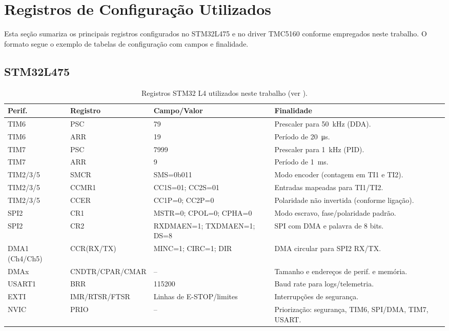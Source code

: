 \FloatBarrier
\section{Registros de Configura\c{c}\~ao Utilizados}

Esta se\c{c}\~ao sumariza os principais registros configurados no STM32L475 e
no driver TMC5160 conforme empregados neste trabalho. O formato segue o
exemplo de tabelas de configura\c{c}\~ao com campos e finalidade.

\subsection{STM32L475}

\begin{table}[H]
  \centering
  \caption{Registros STM32 L4 utilizados neste trabalho (ver \cite{st_an4013,stm32l4_rm}).}
  \label{tab:regs-stm32}
  \setlength{\tabcolsep}{4pt}\footnotesize
  \begin{tabularx}{\textwidth}{lllX}
    \toprule
    Perif. & Registro & Campo/Valor & Finalidade \\
    \midrule
    TIM6 & PSC & 79 & Prescaler para \SI{50}{kHz} (DDA). \\
    TIM6 & ARR & 19 & Per\'iodo de \SI{20}{\micro s}. \\
    TIM7 & PSC & 7999 & Prescaler para \SI{1}{kHz} (PID). \\
    TIM7 & ARR & 9 & Per\'iodo de \SI{1}{ms}. \\
    TIM2/3/5 & SMCR & SMS=0b011 & Modo encoder (contagem em TI1 e TI2). \\
    TIM2/3/5 & CCMR1 & CC1S=01; CC2S=01 & Entradas mapeadas para TI1/TI2. \\
    TIM2/3/5 & CCER & CC1P=0; CC2P=0 & Polaridade n\~ao invertida (conforme liga\c{c}\~ao). \\
    SPI2 & CR1 & MSTR=0; CPOL=0; CPHA=0 & Modo escravo, fase/polaridade padr\~ao. \\
    SPI2 & CR2 & RXDMAEN=1; TXDMAEN=1; DS=8 & SPI com DMA e palavra de 8 bits. \\
    DMA1 (Ch4/Ch5) & CCR(RX/TX) & MINC=1; CIRC=1; DIR & DMA circular para SPI2 RX/TX. \\
    DMAx & CNDTR/CPAR/CMAR & -- & Tamanho e endere\c{c}os de perif. e mem\'oria. \\
    USART1 & BRR & 115200 & Baud rate para logs/telemetria. \\
    EXTI & IMR/RTSR/FTSR & Linhas de E-STOP/limites & Interrup\c{c}\~oes de seguran\c{c}a. \\
    NVIC & PRIO & -- & Prioriza\c{c}\~ao: seguran\c{c}a, TIM6, SPI/DMA, TIM7, USART. \\
    \bottomrule
  \end{tabularx}
\end{table}

